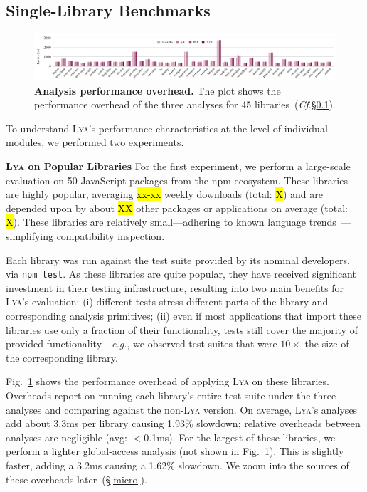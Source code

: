 \documentclass[letterpaper,twocolumn,10pt]{article}
\def\eg{{\em e.g.}, }
\newcommand{\heading}[1]{\vspace{2pt}\noindent\textbf{#1}\enspace}
\newcommand{\ttt}[1]{\texttt{#1}}
\newcommand{\cf}[1]{(\emph{Cf}.\S\ref{#1})}
\newcommand{\sx}[1]{(\S\ref{#1})}
\newcommand{\sys}{{\scshape Lya}\xspace}
\newcommand{\todo}[1]{\hl{#1}\xspace}
\begin{document}
\subsection{Single-Library Benchmarks}
\label{meso}

\begin{figure}[t]
  \centering
   \includegraphics[width=\textwidth]{./figs/micro-packages.pdf}
  \caption{
    \textbf{Analysis performance overhead.}
    The plot shows the performance overhead of the three analyses for 45 libraries~\cf{meso}.
  }
  \label{fig:micro-packages}
  \vspace{-3mm}
\end{figure}

To understand \sys's performance characteristics at the level of individual modules, we performed two experiments.

\heading{\sys on Popular Libraries}
For the first experiment, we perform a large-scale evaluation on 50 JavaScript packages from the npm ecosystem.
These libraries are highly popular, averaging \todo{xx-xx} weekly downloads (total: \todo{X}) and are depended upon by about \todo{XX} other packages or applications on average (total: \todo{X}).
These libraries are relatively small---adhering to known language trends~\cite{npmstudy:19}---simplifying compatibility inspection.

Each library was run against the test suite provided by its nominal developers, via \ttt{npm test}.
As these libraries are quite popular, they have received significant investment in their testing infrastructure, resulting into two main benefits for \sys's evaluation:
  (i) different tests stress different parts of the library and corresponding analysis primitives;
  (ii) even if most applications that import these libraries use only a fraction of their functionality, tests still cover the majority of provided functionality---\eg we observed test suites that were $10\times$ the size of the corresponding library.  

Fig.~\ref{fig:micro-packages} shows the performance overhead of applying \sys on these libraries.
Overheads report on running each library's entire test suite under the three analyses and comparing against the non-\sys version.
On average, \sys's analyses add about 3.3ms per library causing 1.93\% slowdown;
  relative overheads between analyses are negligible (avg: $<$0.1ms).
For the largest of these libraries, we perform a lighter global-access analysis (not shown in Fig.~\ref{fig:micro-packages}).
This is slightly faster, adding a 3.2ms causing a 1.62\% slowdown.
We zoom into the sources of these overheads later~\sx{micro}.
\end{document}
